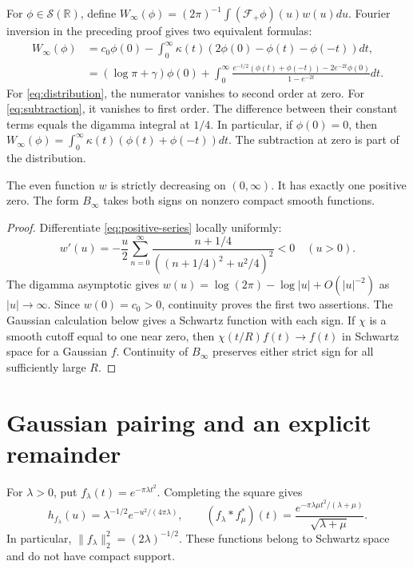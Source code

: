 \documentclass[11pt]{article}
\begin{document}
For $\phi\in\mathcal S(\mathbb R)$, define
$W_\infty(\phi)=(2\pi)^{-1}\int(\mathcal F_+\phi)(u)w(u)du$.
Fourier inversion in the preceding proof gives two equivalent formulas:
\begin{align}
 W_\infty(\phi)
 &=c_0\phi(0)-\int_0^\infty\kappa(t)
                 (2\phi(0)-\phi(t)-\phi(-t))dt,\label{eq:distribution}\\
 &=(\log\pi+\gamma)\phi(0)
   +\int_0^\infty
    \frac{e^{-t/2}(\phi(t)+\phi(-t))-2e^{-2t}\phi(0)}{1-e^{-2t}}dt.
    \label{eq:subtraction}
\end{align}
For \eqref{eq:distribution}, the numerator vanishes to second order at zero.
For \eqref{eq:subtraction}, it vanishes to first order.
The difference between their constant terms equals the digamma integral at $1/4$.
In particular, if $\phi(0)=0$, then
$W_\infty(\phi)=\int_0^\infty\kappa(t)(\phi(t)+\phi(-t))dt$.
The subtraction at zero is part of the distribution.

\begin{proposition}\label{prop:sign}
The even function $w$ is strictly decreasing on $(0,\infty)$.
It has exactly one positive zero.
The form $B_\infty$ takes both signs on nonzero compact smooth functions.
\end{proposition}
\begin{proof}
Differentiate \eqref{eq:positive-series} locally uniformly:
\[
 w'(u)=-\frac u2\sum_{n=0}^\infty
       \frac{n+1/4}{((n+1/4)^2+u^2/4)^2}<0\quad(u>0).
\]
The digamma asymptotic \cite[Eq.~5.11.2]{dlmf} gives
$w(u)=\log(2\pi)-\log|u|+O(|u|^{-2})$ as $|u|\to\infty$.
Since $w(0)=c_0>0$, continuity proves the first two assertions.
The Gaussian calculation below gives a Schwartz function with each sign.
If $\chi$ is a smooth cutoff equal to one near zero, then
$\chi(t/R)f(t)\to f(t)$ in Schwartz space for a Gaussian $f$.
Continuity of $B_\infty$ preserves either strict sign for all sufficiently large $R$.
\end{proof}

\section{Gaussian pairing and an explicit remainder}

For $\lambda>0$, put $f_\lambda(t)=e^{-\pi\lambda t^2}$.
Completing the square gives
\[
 h_{f_\lambda}(u)=\lambda^{-1/2}e^{-u^2/(4\pi\lambda)},\qquad
 (f_\lambda*f_\mu^*)(t)=\frac{e^{-\pi\lambda\mu t^2/(\lambda+\mu)}}{\sqrt{\lambda+\mu}}.
\]
In particular, $\|f_\lambda\|_2^2=(2\lambda)^{-1/2}$.
These functions belong to Schwartz space and do not have compact support.
\end{document}
